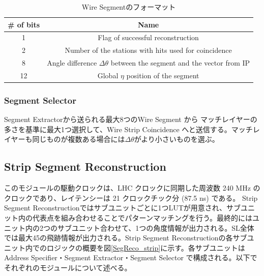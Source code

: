 \begin{table}[h]
    \centering
    \caption{Wire Segmentのフォーマット}
    \label{tab:WireSegment}
    \begin{tabular}{|c|c|}
    \hline
    \# of bits & Name                                                                       \\ \hline\hline
    1          & Flag of successful reconstruction                                          \\ \hline
    2          & Number of the stations with hits used for coincidence                      \\ \hline
    8          & Angle difference $\Delta\theta$ between the segment and the vector from IP \\ \hline
    12         & Global $\eta$ position of the segment                                      \\ \hline
    \end{tabular}
\end{table}

\subsubsection*{Segment Selector}
Segment Extractorから送られる最大8つのWire Segment から マッチレイヤーの多さを基準に最大1つ選択して、Wire Strip Coincidence へと送信する。マッチレイヤーも同じものが複数ある場合には$\Delta\theta$がより小さいものを選ぶ。

\subsection*{Strip Segment Reconstruction}
このモジュールの駆動クロックは、LHC クロックに同期した周波数 240 MHz のクロックであり、レイテンシーは 21 クロックチック分 (87.5 ns) である。
Strip Segment Reconstructionではサブユニットごとに1つLUTが用意され、サブユニット内の代表点を組み合わせることでパターンマッチングを行う。最終的にはユニット内の2つのサブユニット合わせて、1つの角度情報が出力される。SL全体では最大45の飛跡情報が出力される。Strip Segment Reconstructionの各サブユニット内でのロジックの概要を図\ref{SegReco_strip}に示す。各サブユニットはAddress Specifier・Segment Extractor・Segment Selector で構成される。以下でそれぞれのモジュールについて述べる。

